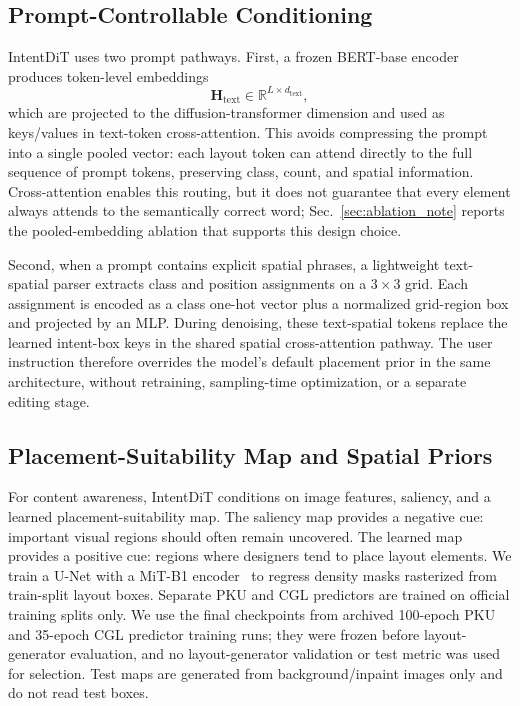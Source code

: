 \documentclass[review]{elsarticle}
\begin{document}
\subsection{Prompt-Controllable Conditioning}
\label{sec:prompt_conditioning}

IntentDiT uses two prompt pathways.
First, a frozen BERT-base encoder~\cite{Devlin19} produces token-level embeddings
\begin{equation}
\mathbf{H}_{\text{text}}\in\mathbb{R}^{L\times d_{\text{text}}},
\end{equation}
which are projected to the diffusion-transformer dimension and used as keys/values in text-token cross-attention.
This avoids compressing the prompt into a single pooled vector: each layout token can attend directly to the full sequence of prompt tokens, preserving class, count, and spatial information.
Cross-attention enables this routing, but it does not guarantee that every element always attends to the semantically correct word; Sec.~\ref{sec:ablation_note} reports the pooled-embedding ablation that supports this design choice.

Second, when a prompt contains explicit spatial phrases, a lightweight text-spatial parser extracts class and position assignments on a $3{\times}3$ grid.
Each assignment is encoded as a class one-hot vector plus a normalized grid-region box and projected by an MLP.
During denoising, these text-spatial tokens replace the learned intent-box keys in the shared spatial cross-attention pathway.
The user instruction therefore overrides the model's default placement prior in the same architecture, without retraining, sampling-time optimization, or a separate editing stage.

\subsection{Placement-Suitability Map and Spatial Priors}
\label{sec:intent_map}

For content awareness, IntentDiT conditions on image features, saliency, and a learned placement-suitability map.
The saliency map provides a negative cue: important visual regions should often remain uncovered.
The learned map provides a positive cue: regions where designers tend to place layout elements.
We train a U-Net with a MiT-B1 encoder~\cite{Ronneberger15} to regress density masks rasterized from train-split layout boxes.
Separate PKU and CGL predictors are trained on official training splits only.
We use the final checkpoints from archived 100-epoch PKU and 35-epoch CGL predictor training runs; they were frozen before layout-generator evaluation, and no layout-generator validation or test metric was used for selection.
Test maps are generated from background/inpaint images only and do not read test boxes.
\end{document}
